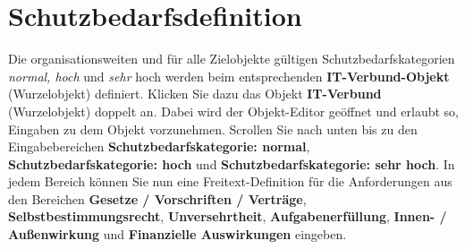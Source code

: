 \documentclass[a4paper,10pt]{book}
\begin{document}
\section{Schutzbedarfsdefinition}
Die organisationsweiten und für alle Zielobjekte gültigen Schutzbedarfskategorien \textit{normal, hoch} und \textit{sehr} hoch werden beim entsprechenden \textbf{IT-Verbund-Objekt} (Wurzelobjekt) definiert. Klicken Sie dazu das Objekt \textbf{IT-Verbund} (Wurzelobjekt) doppelt an. Dabei wird der Objekt-Editor geöffnet und erlaubt so, Eingaben zu dem Objekt vorzunehmen. Scrollen Sie nach unten bis zu den Eingabebereichen \textbf{Schutzbedarfskategorie: normal}, \textbf{Schutzbedarfskategorie: hoch} und \textbf{Schutzbedarfskategorie: sehr hoch}. In jedem Bereich können Sie nun eine Freitext-Definition für die Anforderungen aus den Bereichen \textbf{Gesetze / Vorschriften / Verträge},  \textbf{Selbstbestimmungsrecht}, \textbf{Unversehrtheit}, \textbf{Aufgabenerfüllung}, \textbf{Innen- / Außenwirkung} und \textbf{Finanzielle Auswirkungen} eingeben.
\end{document}
